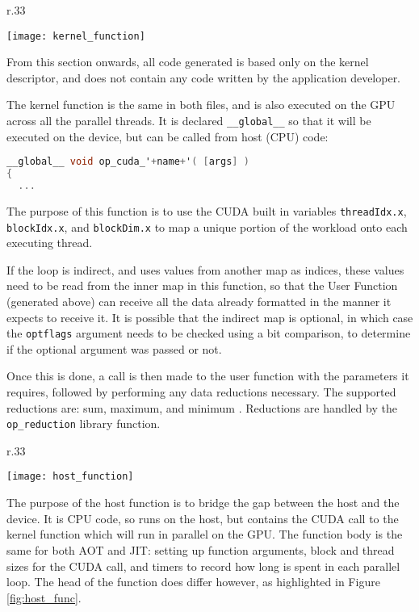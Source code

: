 \begin{wrapfigure}[13]{r}{.33\textwidth}
  \centering
  \caption{Kernel Function}
  \label{fig:krnl_func}
  \texttt{[image: kernel\_function]}
\end{wrapfigure}
From this section onwards, all code generated is based only on the kernel descriptor, and does not contain any code written by the application developer.
\par The kernel function is the same in both files, and is also executed on the GPU across all the parallel threads. It is declared \verb|__global__| so that it will be executed on the device, but can be called from host (CPU) code:
\begin{lstlisting}[language=C, backgroundcolor=\color{red!20}]
__global__ void op_cuda_'+name+'( [args] )
{
  ...
\end{lstlisting}

\noindent The purpose of this function is to use the CUDA built in variables \verb|threadIdx.x|, \verb|blockIdx.x|, and \verb|blockDim.x| to map a unique portion of the workload onto each executing thread.

 If the loop is indirect, and uses values from another map as indices, these values need to be read from the inner map in this function, so that the User Function (generated above) can receive all the data already formatted in the manner it expects to receive it. It is possible that the indirect map is optional, in which case the \verb|optflags| argument needs to be checked using a bit comparison, to determine if the optional argument was passed or not.
\par
Once this is done, a call is then made to the user function with the parameters it requires, followed by performing any data reductions necessary. The supported reductions are: sum, maximum, and minimum \cite[p11]{manual}. Reductions are handled by the \verb|op_reduction| library function.

\begin{wrapfigure}[10]{r}{.33\textwidth}
  \centering
  \caption{Host Function}
  \label{fig:host_func}
  \texttt{[image: host\_function]}
\end{wrapfigure}
The purpose of the host function is to bridge the gap between the host and the device. It is CPU code, so runs on the host, but contains the CUDA call to the kernel function which will run in parallel on the GPU. The function body is the same for both AOT and JIT: setting up function arguments, block and thread sizes for the CUDA call, and timers to record how long is spent in each parallel loop. The head of the function does differ however, as highlighted in Figure \ref{fig:host_func}.
\vspace{\parskip}

